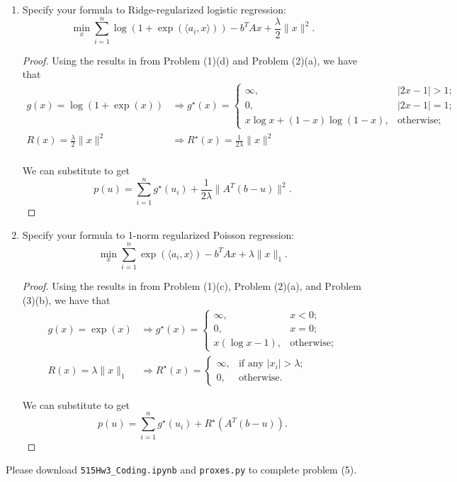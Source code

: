 \documentclass[11pt]{amsart}
\begin{document}
\begin{enumerate}
\begin{enumerate}
\item Specify your formula to Ridge-regularized logistic regression: 
\[
\min_x \sum_{i=1}^n \log(1+\exp(\langle a_i, x \rangle))  - b^TAx  + \frac{\lambda}{2}\|x\|^2. 
\]

\begin{proof}
  Using the results in from Problem (1)(d) and Problem (2)(a), we have that
  \begin{align*}
    g(x) = \log(1 + \exp\left(x\right))
    &\Rightarrow
      g^\star(x) = \begin{cases}
        \infty, &|2x - 1| > 1; \\
        0, &|2x - 1| = 1; \\
        x\log x + \left(1 - x\right) \log\left(1 - x\right), &\text{otherwise};
      \end{cases}
    \\
    R(x) = \frac{\lambda}{2}\|x\|^2
    &\Rightarrow R^\star(x) = \frac{1}{2\lambda}\|x\|^2 \\
  \end{align*}

  We can substitute to get
  \begin{equation*}
    p(u) = \sum_{i=1}^ng^\star\left(u_i\right) + \frac{1}{2\lambda}\|A^T\left(b - u\right)\|^2.
  \end{equation*}
\end{proof}

\item Specify your formula to 1-norm regularized Poisson regression: 
\[
\min_x \sum_{i=1}^n \exp(\langle a_i, x \rangle) - b^TAx +  \lambda\|x\|_1. 
\]
\begin{proof}
  Using the results in from Problem (1)(c), Problem (2)(a), and Problem (3)(b), we have that
  \begin{align*}
    g(x) = \exp(x)
    &\Rightarrow
      g^\star(x) = \begin{cases}
        \infty, &x < 0; \\
        0, &x = 0; \\
        x\left(\log x - 1\right), &\text{otherwise};
      \end{cases}
    \\
    R(x) = \lambda\|x\|_1 &\Rightarrow R^\star(x) = \begin{cases}
      \infty, &\text{if any $\left|x_i\right| > \lambda$}; \\
      0, &\text{otherwise.}
    \end{cases}
  \end{align*}

  We can substitute to get
  \begin{equation*}
    p(u) = \sum_{i=1}^ng^\star\left(u_i\right) + R^\star\left(A^T\left(b - u\right)\right).
  \end{equation*}
\end{proof}


\end{enumerate}
\bigskip \bigskip
\end{enumerate}
\vskip 8pt
Please download \texttt{515Hw3\_Coding.ipynb} and \texttt{proxes.py} to complete problem (5).
\end{document}
